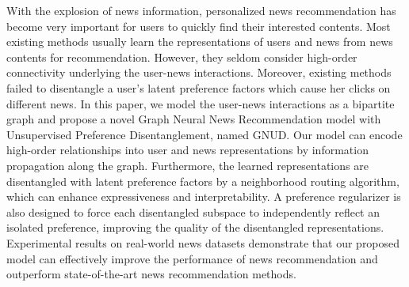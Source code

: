 With the explosion of news information, personalized news recommendation has become very important for users to quickly find their interested contents. Most existing methods usually learn the representations of users and news from news contents for recommendation. However, they seldom consider high-order connectivity underlying the user-news interactions. Moreover, existing methods failed to disentangle a user's latent preference factors which cause her clicks on different news. In this paper, we model the user-news interactions as a bipartite graph and propose a novel Graph Neural News Recommendation model with Unsupervised Preference Disentanglement, named GNUD. Our model can encode high-order relationships into user and news representations by information propagation along the graph. Furthermore, the learned representations are disentangled with latent preference factors by a neighborhood routing algorithm, which can enhance expressiveness and interpretability. A preference regularizer is also designed to force each disentangled subspace to independently reflect an isolated preference, improving the quality of the disentangled representations. Experimental results on real-world news datasets demonstrate that our proposed model can effectively improve the performance of news recommendation and outperform state-of-the-art news recommendation methods.
